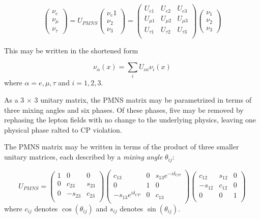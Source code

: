 \begin{equation}
\begin{pmatrix} \nu_e \\ 	\nu_\mu \\	\nu_\tau \end{pmatrix} = 
U_{PMNS} \begin{pmatrix} \nu_e1\\ 	\nu_2 \\	\nu_3 \end{pmatrix} = 
\begin{pmatrix}
 U_{e 1} & U_{e 2} & U_{e 3} \\
 U_{\mu 1} & U_{\mu 2} & U_{\mu 3} \\
 U_{\tau 1} & U_{\tau 2} & U_{\tau 3} \\
\end{pmatrix} 	
\begin{pmatrix} \nu_1 \\ 	\nu_2 \\	\nu_3 \end{pmatrix}
\label{eqn:3flavor_pmns}
\end{equation}

This may be written in the shortened form

\begin{equation}
\nu_{\alpha}\left(x\right) = \sum_i U_{\alpha i} \nu_{i}\left(x\right)
\label{eqn:3flavor_short}
\end{equation}
%
where ${\alpha=e,\mu,\tau}$ and ${i=1,2,3}$. 

As a 3 ${\times}$ 3 unitary matrix, the PMNS matrix may be parametrized in terms of three mixing angles and six phases.
Of these phases, five may be removed by rephasing the lepton fields with no change to the underlying physics, leaving one physical phase ralted to CP violation.

The PMNS matrix may be written in terms of the product of three smaller unitary matrices, each described by a \emph{mixing angle} $\theta_{ij}$: 

\begin{equation}
U_{PMNS} = 
\begin{pmatrix}
1 & 0 & 0 \\
0 & c_{23} & s_{23} \\
0 & -s_{23} & c_{23} \\
\end{pmatrix}
\begin{pmatrix}
c_{13} & 0 & s_{13} e^{-i\delta_{CP}} \\
0 & 1 & 0 \\
-s_{13} e^{i \delta_{CP}} & 0 & c_{13} \\
\end{pmatrix}
\begin{pmatrix}
c_{12} & s_{12} & 0 \\
-s_{12} & c_{12} & 0 \\
0 & 0 & 1 \\
\end{pmatrix}
\label{eqn:pmns_parametrized}
\end{equation}
%
where ${c_{ij}}$ denotes ${\cos\left(\theta_{ij}\right)}$ and ${s_{ij}}$ denotes ${\sin\left(\theta_{ij}\right)}$.

